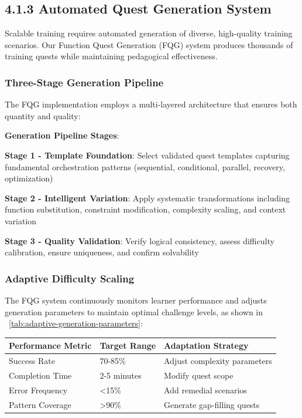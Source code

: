 \subsection*{4.1.3 Automated Quest Generation System}

Scalable training requires automated generation of diverse, high-quality training scenarios. Our Function Quest Generation (FQG) system produces thousands of training quests while maintaining pedagogical effectiveness.

\subsubsection*{Three-Stage Generation Pipeline}

The FQG implementation employs a multi-layered architecture that ensures both quantity and quality:

\begin{alertbox}
\textbf{Generation Pipeline Stages}:
\begin{compactlist}
    \item \textbf{Stage 1 - Template Foundation}: Select validated quest templates capturing fundamental orchestration patterns (sequential, conditional, parallel, recovery, optimization)
    \item \textbf{Stage 2 - Intelligent Variation}: Apply systematic transformations including function substitution, constraint modification, complexity scaling, and context variation
    \item \textbf{Stage 3 - Quality Validation}: Verify logical consistency, assess difficulty calibration, ensure uniqueness, and confirm solvability
\end{compactlist}
\end{alertbox}

\subsubsection*{Adaptive Difficulty Scaling}

The FQG system continuously monitors learner performance and adjusts generation parameters to maintain optimal challenge levels, as shown in ~\ref{tab:adaptive-generation-parameters}:

\begin{center}
\begin{tabular}{@{}lll@{}}
\toprule
\textbf{Performance Metric} & \textbf{Target Range} & \textbf{Adaptation Strategy} \\
\midrule
Success Rate & 70-85\% & Adjust complexity parameters \\
Completion Time & 2-5 minutes & Modify quest scope \\
Error Frequency & <15\% & Add remedial scenarios \\
Pattern Coverage & >90\% & Generate gap-filling quests \\
\bottomrule
\end{tabular}
\label{tab:adaptive-generation-parameters}
\end{center}

